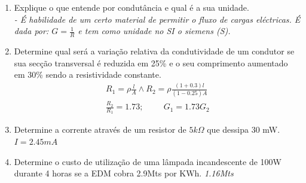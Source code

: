 \documentclass[12pt,a4paper,titlepage]{report}
\begin{document}
\begin{enumerate}
\item Explique o que entende por condutância e qual é a sua unidade.\\
\color{red}\textit{- \'E habilidade de um certo material de permitir o fluxo de cargas el\'ectricas. \'E dada por: $G=\frac{1}{R}$ e tem como unidade no SI o siemens (S).}\color{black}

\item Determine qual será a variação relativa da condutividade de um condutor se sua secção transversal é reduzida em 25\% e o seu comprimento aumentado em 30\% sendo a resistividade constante.\\ \color{red}
\begin{eqnarray}
R_1=\rho\frac{l}{A} \wedge R_2=\rho\frac{(1+0.3)l}{(1-0.25)A}\\
\frac{R_2}{R_1}=1.73 ;\hspace{1cm} G_1=1.73G_2
\end{eqnarray}
\color{black}
\item Determine a corrente através de um resistor de $5k\Omega$ que dessipa 30 mW.
\color{red}\textit{$I=2.45mA$}\color{black}

\item Determine o custo de utilização de uma lâmpada incandescente de 100W durante 4 horas se a EDM cobra 2.9Mts por KWh.
\color{red} \textit{1.16Mts}\color{black}


\end{enumerate}
\end{document}
